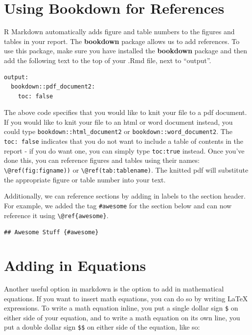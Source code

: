 \documentclass[
  letterpaper,
]{krantz}
\begin{document}
\hypertarget{using-bookdown-for-references}{%
\section{Using Bookdown for
References}\label{using-bookdown-for-references}}

R Markdown automatically adds figure and table numbers to the figures
and tables in your report. The \textbf{bookdown} package allows us to
add references. To use this package, make sure you have installed the
\textbf{bookdown} package and then add the following text to the top of
your .Rmd file, next to ``output''.

\begin{verbatim}
output:
  bookdown::pdf_document2:
    toc: false
\end{verbatim}

The above code specifies that you would like to knit your file to a pdf
document. If you would like to knit your file to an html or word
document instead, you could type \texttt{bookdown::html\_document2} or
\texttt{bookdown::word\_document2}. The \texttt{toc:\ false} indicates
that you do not want to include a table of contents in the report - if
you do want one, you can simply type \texttt{toc:true} instead. Once
you've done this, you can reference figures and tables using their
names: \texttt{\textbackslash{}@ref(fig:figname))} or
\texttt{\textbackslash{}@ref(tab:tablename)}. The knitted pdf will
substitute the appropriate figure or table number into your text.

Additionally, we can reference sections by adding in labels to the
section header. For example, we added the tag \texttt{\#awesome} for the
section below and can now reference it using
\texttt{\textbackslash{}@ref\{awesome\}}.

\texttt{\#\#\ Awesome\ Stuff\ \{\#awesome\}}

\hypertarget{adding-in-equations}{%
\section{Adding in Equations}\label{adding-in-equations}}

Another useful option in markdown is the option to add in mathematical
equations. If you want to insert math equations, you can do so by
writing LaTeX expressions. To write a math equation inline, you put a
single dollar sign \texttt{\$} on either side of your equation, and to
write a math equation on its own line, you put a double dollar sign
\texttt{\$\$} on either side of the equation, like so:
\end{document}
